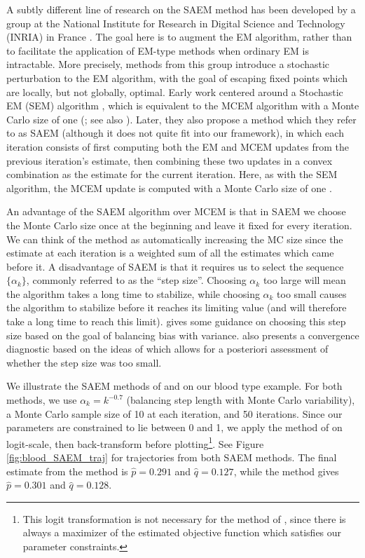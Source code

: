 \documentclass[11pt, oneside]{article}   	%
\begin{document}
A subtly different line of research on the SAEM method has been developed by a group at the National Institute for Research in Digital Science and Technology (INRIA) in France \citep[see, e.g.,][for a review of some of their methods]{Cel95}. The goal here is to augment the EM algorithm, rather than to facilitate the application of EM-type methods when ordinary EM is intractable. More precisely, methods from this group introduce a stochastic perturbation to the EM algorithm, with the goal of escaping fixed points which are locally, but not globally, optimal. Early work centered around a Stochastic EM (SEM) algorithm \citep{Cel85}, which is equivalent to the MCEM algorithm with a Monte Carlo size of one (\citealp{Cel87,Cel95}; see also \citealp{Nie00II}). Later, they also propose a method which they refer to as SAEM (although it does not quite fit into our framework), in which each iteration consists of first computing both the EM and MCEM updates from the previous iteration's estimate, then combining these two updates in a convex combination as the estimate for the current iteration. Here, as with the SEM algorithm, the MCEM update is computed with a Monte Carlo size of one \citep{Cel92, Cel95}.

An advantage of the SAEM algorithm over MCEM is that in SAEM we choose the Monte Carlo size once at the beginning and leave it fixed for every iteration. We can think of the method as automatically increasing the MC size since the estimate at each iteration is a weighted sum of all the estimates which came before it. A disadvantage of SAEM is that it requires us to select the sequence $\{ \alpha_k \}$, commonly referred to as the ``step size''. Choosing $\alpha_k$ too large will mean the algorithm takes a long time to stabilize, while choosing $\alpha_k$ too small causes the algorithm to stabilize before it reaches its limiting value (and will therefore take a long time to reach this limit). \citet{Jan06} gives some guidance on choosing this step size based on the goal of balancing bias with variance. \citeauthor{Jan06} also presents a convergence diagnostic based on the ideas of \citet{Caf05} which allows for a posteriori assessment of whether the step size was too small. 

We illustrate the SAEM methods of \citet{Gu98I} and \citet{Del99} on our blood type example. For both methods, we use $\alpha_k = k^{-0.7}$ (balancing step length with Monte Carlo variability), a Monte Carlo sample size of 10 at each iteration, and 50 iterations. Since our parameters are constrained to lie between 0 and 1, we apply the method of \citeauthor{Gu98I} on logit-scale, then back-transform before plotting\footnote{This logit transformation is not necessary for the method of \citet{Del99}, since there is always a maximizer of the estimated objective function which satisfies our parameter constraints.}. See Figure \ref{fig:blood_SAEM_traj} for trajectories from both SAEM methods. The final estimate from the \citeauthor{Gu98I} method is $\hat{p} = 0.291$ and $\hat{q} = 0.127$, while the \citeauthor{Del99} method gives $\hat{p} = 0.301$ and $\hat{q} = 0.128$. 
\end{document}
